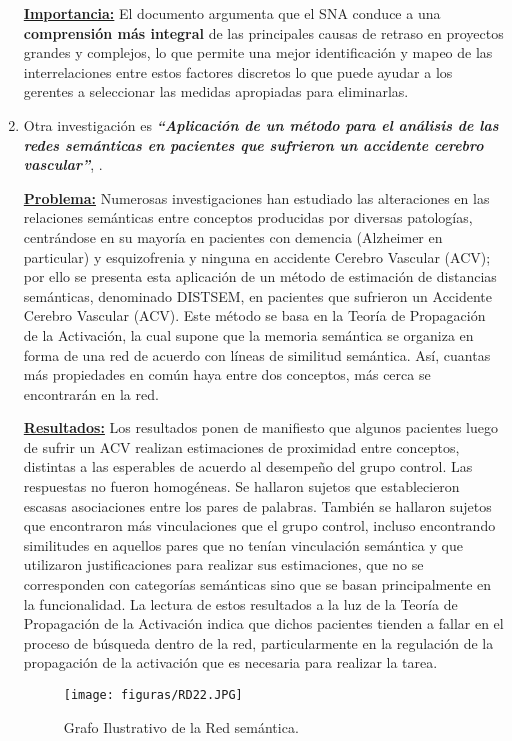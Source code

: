 \documentclass[10pt,conference]{IEEEtran}
\begin{document}
\begin{enumerate}
\textbf{\underline{Importancia:}}  El documento argumenta que el SNA conduce a una \textbf{comprensión más integral} de las principales causas de retraso en proyectos grandes y complejos, lo que permite una mejor identificación y mapeo de las interrelaciones entre estos factores discretos lo que puede ayudar a los gerentes a seleccionar las medidas apropiadas para eliminarlas.


\item Otra investigación es \textit{\textbf{“Aplicación de un método para el análisis de las redes semánticas en pacientes que sufrieron un accidente cerebro vascular”}}, \citep{vivas2010aplicacion}.

\textbf{\underline{Problema:}}
Numerosas investigaciones han estudiado las alteraciones en las relaciones semánticas entre conceptos producidas por diversas patologías, centrándose en su mayoría en pacientes con demencia (Alzheimer en particular) y esquizofrenia y ninguna en accidente Cerebro Vascular (ACV); por ello se presenta esta aplicación de un método de estimación de distancias semánticas, denominado DISTSEM, en pacientes que sufrieron un Accidente Cerebro Vascular (ACV). Este método se basa en la Teoría de Propagación de la Activación,  la cual supone que la memoria semántica se organiza en forma de una red de acuerdo con líneas de similitud semántica. Así, cuantas más propiedades en común haya entre dos conceptos, más cerca se encontrarán en la red.

\textbf{\underline{Resultados:}}
Los resultados ponen de manifiesto que algunos pacientes luego de sufrir un ACV realizan estimaciones de proximidad entre conceptos, distintas a las esperables de acuerdo al desempeño del grupo control. Las respuestas no fueron homogéneas. Se hallaron sujetos que establecieron escasas asociaciones entre los pares de palabras. También se hallaron sujetos que encontraron más vinculaciones que el grupo control, incluso encontrando similitudes en aquellos pares que no tenían vinculación semántica y que utilizaron justificaciones para realizar sus estimaciones, que no se corresponden con categorías semánticas sino que se basan principalmente en la funcionalidad. La lectura de estos resultados a la luz de la Teoría de Propagación de la Activación indica que dichos pacientes tienden a fallar en el proceso de búsqueda dentro de la red, particularmente en la regulación de la propagación de la activación que es necesaria para realizar la tarea.

\begin{figure}[H]
\begin{center}
\texttt{[image: figuras/RD22.JPG]}
\caption{Grafo Ilustrativo de la Red semántica.}
\label{RD22} 
\end{center}
\end{figure}


\end{enumerate}
\end{document}

